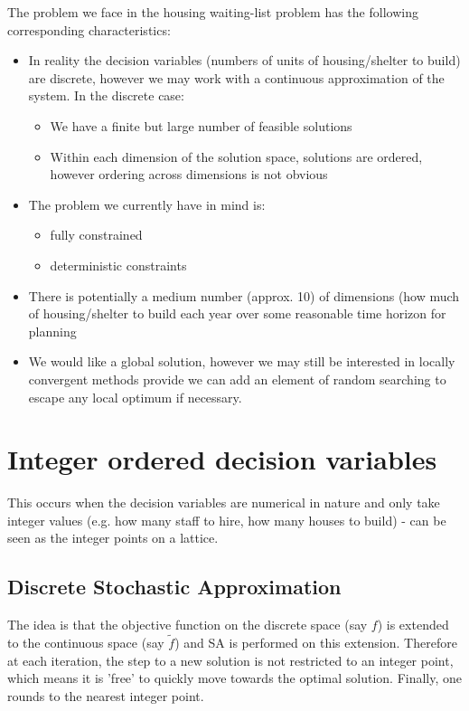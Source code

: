 \documentclass{article}
\begin{document}
The problem we face in the housing waiting-list problem has the following corresponding characteristics:
\begin{itemize}
  \item In reality the decision variables (numbers of units of housing/shelter to build) are discrete, however we may work with a continuous approximation of the system. In the discrete case:
  \begin{itemize}
    \item We have a finite but large number of feasible solutions
    \item Within each dimension of the solution space, solutions are ordered, however ordering across dimensions is not obvious
  \end{itemize}
  \item The problem we currently have in mind is:
  \begin{itemize}
    \item fully constrained
    \item deterministic constraints  
  \end{itemize}
  \item There is potentially a medium number (approx. 10) of dimensions (how much of housing/shelter to build each year over some reasonable time horizon for planning
  \item We would like a global solution, however we may still be interested in locally convergent methods provide we can add an element of random searching to escape any local optimum if necessary. 
\end{itemize}

\newpage

\section{Integer ordered decision variables}

This occurs when the decision variables are numerical in nature and only take integer values (e.g. how many staff to hire, how many houses to build) - can be seen as the integer points on a lattice.

\subsection{Discrete Stochastic Approximation}

The idea is that the objective function on the discrete space (say $f$) is extended to the continuous space (say $\tilde{f}$) and SA is performed on this extension. Therefore at each iteration, the step to a new solution is not restricted to an integer point, which means it is 'free' to quickly move towards the optimal solution. Finally, one rounds to the nearest integer point. \newline
\end{document}
